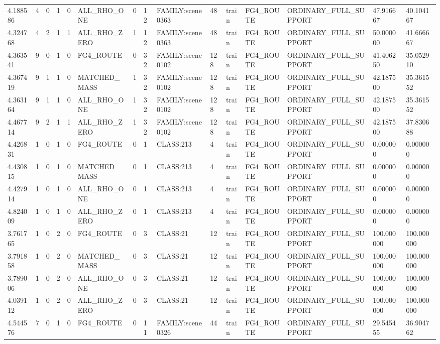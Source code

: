 \begin{tabular}{lllllllllllllll}
4.188586 & 4 & 0 & 1 & 0 & ALL\_RHO\_ONE & 0 & 12 & FAMILY:scene0363 & 48 & train & FG4\_ROUTE & ORDINARY\_FULL\_SUPPORT & 47.916667 & 40.104167 \\
4.324768 & 4 & 2 & 1 & 1 & ALL\_RHO\_ZERO & 1 & 12 & FAMILY:scene0363 & 48 & train & FG4\_ROUTE & ORDINARY\_FULL\_SUPPORT & 50.000000 & 41.666667 \\
4.363541 & 9 & 0 & 1 & 0 & FG4\_ROUTE & 0 & 32 & FAMILY:scene0102 & 128 & train & FG4\_ROUTE & ORDINARY\_FULL\_SUPPORT & 41.406250 & 35.052910 \\
4.367419 & 9 & 1 & 1 & 0 & MATCHED\_MASS & 1 & 32 & FAMILY:scene0102 & 128 & train & FG4\_ROUTE & ORDINARY\_FULL\_SUPPORT & 42.187500 & 35.361552 \\
4.363164 & 9 & 1 & 1 & 0 & ALL\_RHO\_ONE & 1 & 32 & FAMILY:scene0102 & 128 & train & FG4\_ROUTE & ORDINARY\_FULL\_SUPPORT & 42.187500 & 35.361552 \\
4.467714 & 9 & 2 & 1 & 1 & ALL\_RHO\_ZERO & 1 & 32 & FAMILY:scene0102 & 128 & train & FG4\_ROUTE & ORDINARY\_FULL\_SUPPORT & 42.187500 & 37.830688 \\
4.426831 & 1 & 0 & 1 & 0 & FG4\_ROUTE & 0 & 1 & CLASS:213 & 4 & train & FG4\_ROUTE & ORDINARY\_FULL\_SUPPORT & 0.000000 & 0.000000 \\
4.430815 & 1 & 0 & 1 & 0 & MATCHED\_MASS & 0 & 1 & CLASS:213 & 4 & train & FG4\_ROUTE & ORDINARY\_FULL\_SUPPORT & 0.000000 & 0.000000 \\
4.427914 & 1 & 0 & 1 & 0 & ALL\_RHO\_ONE & 0 & 1 & CLASS:213 & 4 & train & FG4\_ROUTE & ORDINARY\_FULL\_SUPPORT & 0.000000 & 0.000000 \\
4.824009 & 1 & 0 & 1 & 0 & ALL\_RHO\_ZERO & 0 & 1 & CLASS:213 & 4 & train & FG4\_ROUTE & ORDINARY\_FULL\_SUPPORT & 0.000000 & 0.000000 \\
3.761765 & 1 & 0 & 2 & 0 & FG4\_ROUTE & 0 & 3 & CLASS:21 & 12 & train & FG4\_ROUTE & ORDINARY\_FULL\_SUPPORT & 100.000000 & 100.000000 \\
3.791858 & 1 & 0 & 2 & 0 & MATCHED\_MASS & 0 & 3 & CLASS:21 & 12 & train & FG4\_ROUTE & ORDINARY\_FULL\_SUPPORT & 100.000000 & 100.000000 \\
3.789006 & 1 & 0 & 2 & 0 & ALL\_RHO\_ONE & 0 & 3 & CLASS:21 & 12 & train & FG4\_ROUTE & ORDINARY\_FULL\_SUPPORT & 100.000000 & 100.000000 \\
4.039112 & 1 & 0 & 2 & 0 & ALL\_RHO\_ZERO & 0 & 3 & CLASS:21 & 12 & train & FG4\_ROUTE & ORDINARY\_FULL\_SUPPORT & 100.000000 & 100.000000 \\
4.544576 & 7 & 0 & 1 & 0 & FG4\_ROUTE & 0 & 11 & FAMILY:scene0326 & 44 & train & FG4\_ROUTE & ORDINARY\_FULL\_SUPPORT & 29.545455 & 36.904762 \\

\end{tabular}
